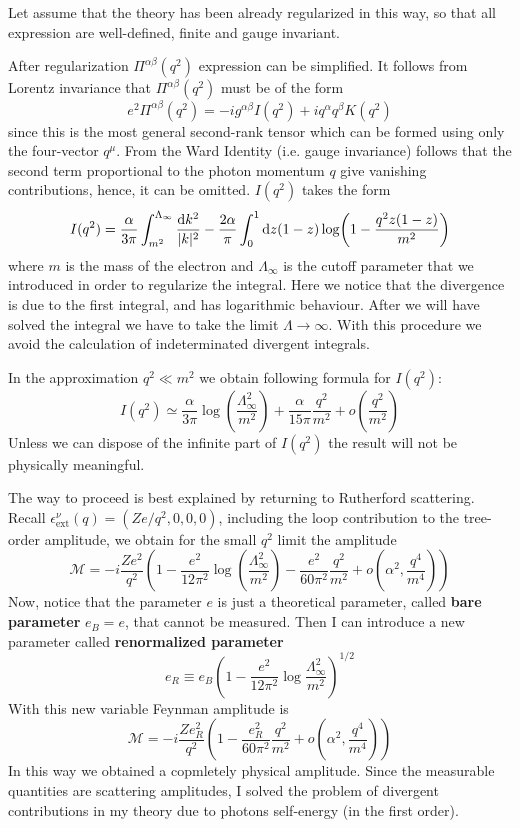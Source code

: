 \documentclass[TheoreticalPhy_ModB.tex]{subfiles}
\begin{document}
Let assume that the theory has been already regularized in this way, so that all expression are well-defined, finite and gauge invariant.

After regularization $\Pi^{\alpha\beta}(q^2)$ expression can be simplified. It follows from Lorentz invariance that $\Pi^{\alpha\beta}(q^2)$ must be of the form
\[e^2\Pi^{\alpha\beta}(q^2)=-ig^{\alpha\beta}I(q^2)+iq^\alpha q^\beta K(q^2)\]
since this is the most general second-rank tensor which can be formed using only the four-vector $q^\mu$. From the Ward Identity (i.e. gauge invariance) follows that the second term proportional to the photon momentum $q$ give vanishing contributions, hence, it can be omitted.
$I(q^2)$ takes the form
\[I(q^2)=\frac\alpha{3\pi}\int^{\Lambda_\infty}_{m^2}\frac{\textup{d} k^2}{|k|^2}-\frac{2\alpha}{\pi}\int_0^1\textup{d} z(1-z)\log(1-\frac{q^2z(1-z)}{m^2})\]
where $m$ is the mass of the electron and $\Lambda_\infty$ is the cutoff parameter that we introduced in order to regularize the integral. Here we notice that the divergence is due to the first integral, and has logarithmic behaviour. After we will have solved the integral we have to take the limit $\Lambda\rightarrow\infty$. With this procedure we avoid the calculation of indeterminated divergent integrals.

In the approximation $q^2\ll m^2$ we obtain following formula for $I(q^2)$:
\[I(q^2)\simeq\frac\alpha{3\pi}\log(\frac{\Lambda_\infty^2}{m^2})+\frac\alpha{15\pi}\frac{q^2}{m^2}+o\left(\frac{q^2}{m^2}\right)\]
Unless we can dispose of the infinite part of $I(q^2)$ the result will not be physically meaningful.

The way to proceed is best explained by returning to Rutherford scattering. Recall $\epsilon^\nu_{\text{ext}}(q)=(Ze/q^2,0,0,0)$, including the loop contribution to the tree-order amplitude, we obtain for the small $q^2$ limit the amplitude
\[\mathcal M=-i\frac{Ze^2}{q^2}\left(1-\frac{e^2}{12\pi^2}\log(\frac{\Lambda_\infty^2}{m^2})-\frac{e^2}{60\pi^2}\frac{q^2}{m^2}+o\left(\alpha^2, \frac{q^4}{m^4}\right)\right)\]
Now, notice that the parameter $e$ is just a theoretical parameter, called \textbf{bare parameter} $e_B=e$, that cannot be measured. Then I can introduce a new parameter called \textbf{renormalized parameter}
\begin{equation}\label{eqn:correction-charge-NLO-QED}
e_R\equiv e_B\left(1-\frac{e^2}{12\pi^2}\log\frac{\Lambda_\infty^2}{m^2}\right)^{1/2}
\end{equation}
With this new variable Feynman amplitude is
\[\mathcal M=-i\frac{Ze_R^2}{q^2}\left(1-\frac{e_R^2}{60\pi^2}\frac{q^2}{m^2}+o\left(\alpha^2, \frac{q^4}{m^4}\right)\right)\]
In this way we obtained a copmletely physical amplitude. Since the measurable quantities are scattering amplitudes, I solved the problem of divergent contributions in my theory due to photons self-energy (in the first order).
\end{document}
